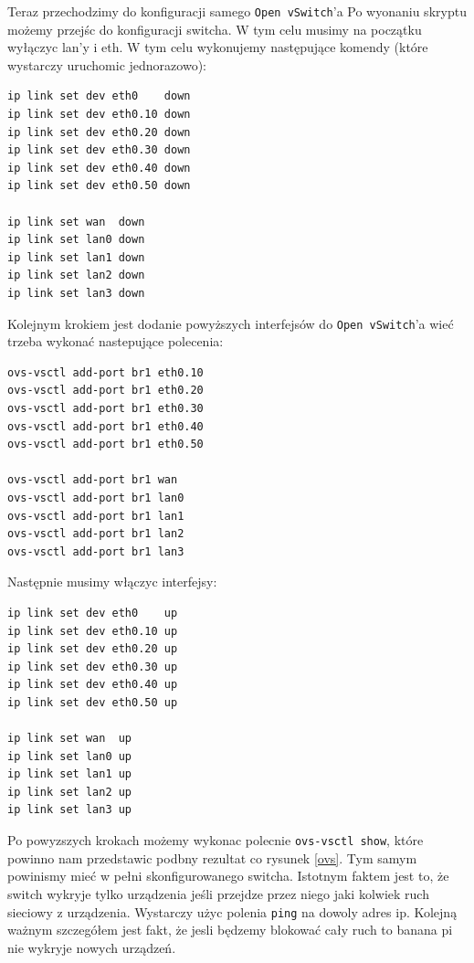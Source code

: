 \documentclass[12pt,a4paper,twoside]{article}
\newcounter{rok}
\begin{document}
Teraz przechodzimy do konfiguracji samego \texttt{Open vSwitch}'a
Po wyonaniu skryptu możemy przejśc do konfiguracji switcha. W tym celu musimy na początku wyłączyc lan'y i eth. W tym celu wykonujemy następujące komendy (które wystarczy uruchomic jednorazowo): 

\begin{verbatim}
ip link set dev eth0	down 
ip link set dev eth0.10 down 
ip link set dev eth0.20 down 
ip link set dev eth0.30 down 
ip link set dev eth0.40 down 
ip link set dev eth0.50 down 

ip link set wan  down
ip link set lan0 down
ip link set lan1 down
ip link set lan2 down
ip link set lan3 down
\end{verbatim}

Kolejnym krokiem jest dodanie powyższych interfejsów do \texttt{Open vSwitch}'a wieć trzeba wykonać nastepujące polecenia: 

\begin{verbatim}
ovs-vsctl add-port br1 eth0.10
ovs-vsctl add-port br1 eth0.20 
ovs-vsctl add-port br1 eth0.30
ovs-vsctl add-port br1 eth0.40
ovs-vsctl add-port br1 eth0.50

ovs-vsctl add-port br1 wan
ovs-vsctl add-port br1 lan0
ovs-vsctl add-port br1 lan1
ovs-vsctl add-port br1 lan2
ovs-vsctl add-port br1 lan3
\end{verbatim}

Następnie musimy włączyc interfejsy:
\begin{verbatim}
ip link set dev eth0	up
ip link set dev eth0.10 up
ip link set dev eth0.20 up
ip link set dev eth0.30 up
ip link set dev eth0.40 up
ip link set dev eth0.50 up

ip link set wan  up
ip link set lan0 up
ip link set lan1 up
ip link set lan2 up
ip link set lan3 up
\end{verbatim}

Po powyzszych krokach możemy wykonac polecnie \texttt{ovs-vsctl show}, które powinno nam przedstawic podbny rezultat
co rysunek \ref{ovs}. Tym samym powinismy mieć w pełni skonfigurowanego switcha. Istotnym faktem jest to, że switch wykryje tylko urządzenia jeśli przejdze przez niego jaki kolwiek ruch sieciowy z urządzenia. Wystarczy użyc polenia \texttt{ping} na dowoly adres ip. Kolejną ważnym szczegółem jest fakt, że jesli będzemy blokować cały ruch to banana pi nie wykryje nowych urządzeń. 
\end{document}
